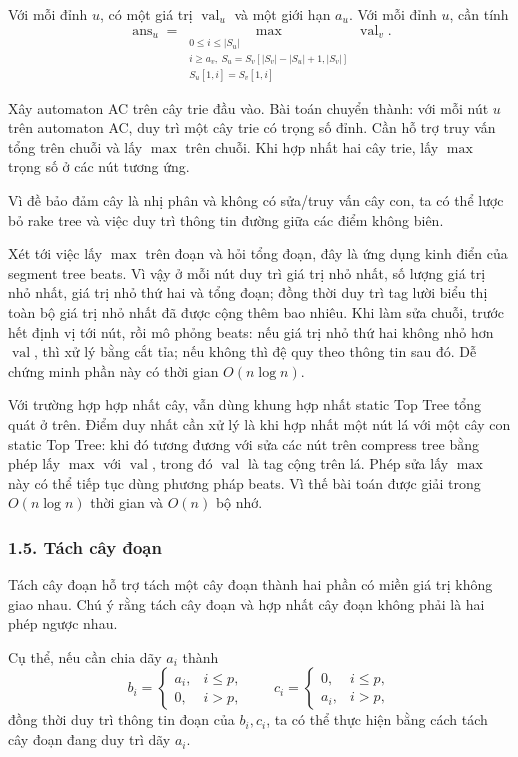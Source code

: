 \documentclass[11pt]{article}
\begin{document}
Với mỗi đỉnh \(u\), có một giá trị \(\operatorname{val}_u\) và một giới hạn
\(a_u\). Với mỗi đỉnh \(u\), cần tính
\[
  \operatorname{ans}_u =
  \max_{\substack{0\le i\le |S_u|\\
  i\ge a_v,\
  S_u=S_v[|S_v|-|S_u|+1,|S_v|]\\
  S_u[1,i]=S_v[1,i]}}
  \operatorname{val}_v .
\]

Xây automaton AC trên cây trie đầu vào. Bài toán chuyển thành: với mỗi nút
\(u\) trên automaton AC, duy trì một cây trie có trọng số đỉnh. Cần hỗ trợ
truy vấn tổng trên chuỗi và lấy \(\max\) trên chuỗi. Khi hợp nhất hai cây trie,
lấy \(\max\) trọng số ở các nút tương ứng.

Vì đề bảo đảm cây là nhị phân và không có sửa/truy vấn cây con, ta có thể lược
bỏ rake tree và việc duy trì thông tin đường giữa các điểm không biên.

Xét tới việc lấy \(\max\) trên đoạn và hỏi tổng đoạn, đây là ứng dụng kinh điển
của segment tree beats. Vì vậy ở mỗi nút duy trì giá trị nhỏ nhất, số lượng giá
trị nhỏ nhất, giá trị nhỏ thứ hai và tổng đoạn; đồng thời duy trì tag lười biểu
thị toàn bộ giá trị nhỏ nhất đã được cộng thêm bao nhiêu. Khi làm sửa chuỗi,
trước hết định vị tới nút, rồi mô phỏng beats: nếu giá trị nhỏ thứ hai không
nhỏ hơn \(\operatorname{val}\), thì xử lý bằng cắt tỉa; nếu không thì đệ quy
theo thông tin sau đó. Dễ chứng minh phần này có thời gian \(O(n\log n)\).

Với trường hợp hợp nhất cây, vẫn dùng khung hợp nhất static Top Tree tổng quát
ở trên. Điểm duy nhất cần xử lý là khi hợp nhất một nút lá với một cây con
static Top Tree: khi đó tương đương với sửa các nút trên compress tree bằng
phép lấy \(\max\) với \(\operatorname{val}\), trong đó \(\operatorname{val}\) là
tag cộng trên lá. Phép sửa lấy \(\max\) này có thể tiếp tục dùng phương pháp
beats. Vì thế bài toán được giải trong \(O(n\log n)\) thời gian và \(O(n)\) bộ
nhớ.

\subsubsection*{1.5. Tách cây đoạn}

Tách cây đoạn hỗ trợ tách một cây đoạn thành hai phần có miền giá trị không
giao nhau. Chú ý rằng tách cây đoạn và hợp nhất cây đoạn không phải là hai phép
ngược nhau.

Cụ thể, nếu cần chia dãy \(a_i\) thành
\[
  b_i=\begin{cases}
    a_i,& i\le p,\\
    0,& i>p,
  \end{cases}
  \qquad
  c_i=\begin{cases}
    0,& i\le p,\\
    a_i,& i>p,
  \end{cases}
\]
đồng thời duy trì thông tin đoạn của \(b_i,c_i\), ta có thể thực hiện bằng cách
tách cây đoạn đang duy trì dãy \(a_i\).
\end{document}
